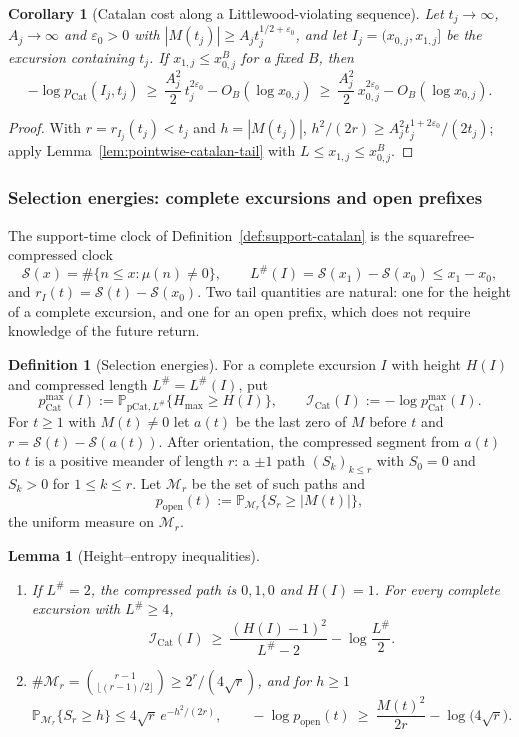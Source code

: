 \documentclass[11pt]{amsart}
\numberwithin{equation}{section}
\theoremstyle{plain}
\newtheorem{lemma}[theorem]{Lemma}
\newtheorem{corollary}[theorem]{Corollary}
\theoremstyle{definition}
\newtheorem{definition}[theorem]{Definition}
\theoremstyle{remark}
\newcommand{\eps}{\varepsilon}
\newcommand{\Sq}{\mathcal{S}}
\begin{document}
\begin{corollary}[Catalan cost along a Littlewood-violating sequence]
\label{cor:catalan-sequence}
Let $t_j\to\infty$, $A_j\to\infty$ and $\eps_0>0$ with
$|M(t_j)|\ge A_jt_j^{1/2+\eps_0}$, and let $I_j=(x_{0,j},x_{1,j}]$ be the
excursion containing $t_j$. If $x_{1,j}\le x_{0,j}^{B}$ for a fixed $B$,
then
\[
-\log p_{\mathrm{Cat}}(I_j,t_j)\ \ge\ \frac{A_j^2}{2}\,t_j^{2\eps_0}
-O_B(\log x_{0,j})\ \ge\ \frac{A_j^2}{2}\,x_{0,j}^{2\eps_0}-O_B(\log x_{0,j}).
\]
\end{corollary}

\begin{proof}
With $r=r_{I_j}(t_j)<t_j$ and $h=|M(t_j)|$,
$h^2/(2r)\ge A_j^2t_j^{1+2\eps_0}/(2t_j)$; apply
Lemma~\ref{lem:pointwise-catalan-tail} with $L\le x_{1,j}\le x_{0,j}^B$.
\end{proof}

\subsubsection*{Selection energies: complete excursions and open prefixes}

The support-time clock of Definition~\ref{def:support-catalan} is the
squarefree-compressed clock
\[
\Sq(x)=\#\{n\le x:\mu(n)\ne0\},\qquad L^\#(I)=\Sq(x_1)-\Sq(x_0)\le x_1-x_0,
\]
and $r_I(t)=\Sq(t)-\Sq(x_0)$. Two tail quantities are natural: one for the
height of a complete excursion, and one for an open prefix, which does not
require knowledge of the future return.

\begin{definition}[Selection energies]
\label{def:selection-energies}
For a complete excursion $I$ with height $H(I)$ and compressed length
$L^\#=L^\#(I)$, put
\[
p^{\max}_{\mathrm{Cat}}(I):=\mathbb P_{\mathrm{pCat},L^\#}\{H_{\max}\ge H(I)\},
\qquad
\mathcal I_{\mathrm{Cat}}(I):=-\log p^{\max}_{\mathrm{Cat}}(I).
\]
For $t\ge1$ with $M(t)\ne0$ let $a(t)$ be the last zero of $M$ before $t$ and
$r=\Sq(t)-\Sq(a(t))$. After orientation, the compressed segment from $a(t)$ to
$t$ is a positive meander of length $r$: a $\pm1$ path $(S_k)_{k\le r}$ with
$S_0=0$ and $S_k>0$ for $1\le k\le r$. Let $\mathcal M_r$ be the set of such
paths and
\[
p_{\mathrm{open}}(t):=\mathbb P_{\mathcal M_r}\{S_r\ge|M(t)|\},
\]
the uniform measure on $\mathcal M_r$.
\end{definition}

\begin{lemma}[Height--entropy inequalities]
\label{lem:height-entropy}
\begin{enumerate}[label=\textup{(\roman*)}]
\item If $L^\#=2$, the compressed path is $0,1,0$ and $H(I)=1$. For every
complete excursion with $L^\#\ge4$,
\[
\mathcal I_{\mathrm{Cat}}(I)\ \ge\ \frac{(H(I)-1)^2}{L^\#-2}-\log\frac{L^\#}2 .
\]
\item $\#\mathcal M_r=\binom{r-1}{\lfloor(r-1)/2\rfloor}\ge2^r/(4\sqrt r)$,
and for $h\ge1$
\[
\mathbb P_{\mathcal M_r}\{S_r\ge h\}\le4\sqrt r\,e^{-h^2/(2r)},
\qquad
-\log p_{\mathrm{open}}(t)\ \ge\ \frac{M(t)^2}{2r}-\log\bigl(4\sqrt r\bigr).
\]
\end{enumerate}
\end{lemma}
\end{document}
